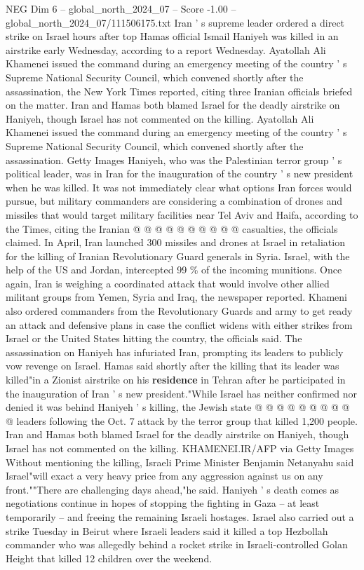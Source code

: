 \begin{textsample}{NEG Dim 6 – global\_north\_2024\_07 – Score -1.00 – global\_north\_2024\_07/111506175.txt}  \label{ex:f6_neg_222}
Iran ' s supreme leader ordered a direct strike on Israel hours after top Hamas official Ismail Haniyeh was killed in an airstrike early Wednesday, according to a report Wednesday.
Ayatollah Ali Khamenei issued the command during an emergency meeting of the country ' s Supreme National Security Council, which convened shortly after the assassination, the New York Times reported, citing three Iranian officials briefed on the matter.
Iran and Hamas both blamed Israel for the deadly airstrike on Haniyeh, though Israel has not commented on the killing.
Ayatollah Ali Khamenei issued the command during an emergency meeting of the country ' s Supreme National Security Council, which convened shortly after the assassination.
Getty Images Haniyeh, who was the Palestinian terror group ' s political leader, was in Iran for the inauguration of the country ' s new president when he was killed.
It was not immediately clear what options Iran forces would pursue, but military commanders are considering a combination of drones and missiles that would target military facilities near Tel Aviv and Haifa, according to the Times, citing the Iranian @ @ @ @ @ @ @ @ @ @ casualties, the officials claimed.
In April, Iran launched 300 missiles and drones at Israel in retaliation for the killing of Iranian Revolutionary Guard generals in Syria.
Israel, with the help of the US and Jordan, intercepted 99 \% of the incoming munitions.
Once again, Iran is weighing a coordinated attack that would involve other allied militant groups from Yemen, Syria and Iraq, the newspaper reported.
Khameni also ordered commanders from the Revolutionary Guards and army to get ready an attack and defensive plans in case the conflict widens with either strikes from Israel or the United States hitting the country, the officials said.
The assassination on Haniyeh has infuriated Iran, prompting its leaders to publicly vow revenge on Israel.
Hamas said shortly after the killing that its leader was killed"in a Zionist airstrike on his \textbf{residence} in Tehran after he participated in the inauguration of Iran ' s new president."While Israel has neither confirmed nor denied it was behind Haniyeh ' s killing, the Jewish state @ @ @ @ @ @ @ @ @ @ leaders following the Oct. 7 attack by the terror group that killed 1,200 people.
Iran and Hamas both blamed Israel for the deadly airstrike on Haniyeh, though Israel has not commented on the killing.
KHAMENEI.IR/AFP via Getty Images Without mentioning the killing, Israeli Prime Minister Benjamin Netanyahu said Israel"will exact a very heavy price from any aggression against us on any front.""There are challenging days ahead,"he said.
Haniyeh ' s death comes as negotiations continue in hopes of stopping the fighting in Gaza -- at least temporarily -- and freeing the remaining Israeli hostages.
Israel also carried out a strike Tuesday in Beirut where Israeli leaders said it killed a top Hezbollah commander who was allegedly behind a rocket strike in Israeli-controlled Golan Height that killed 12 children over the weekend.

\end{textsample}
